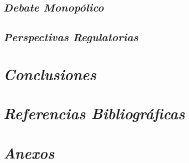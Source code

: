 \documentclass[12pt,a4paper]{article}
\begin{document}
\subsection{{\color{azulnoche}\textbf{\textit{Debate Monopólico}}}}

\subsection{{\color{azulnoche}\textbf{\textit{Perspectivas Regulatorias}}}}
\newpage

\section{{\color{azulnoche}\textbf{\textit{Conclusiones}}}}
\newpage

\section{{\color{azulnoche}\textbf{\textit{Referencias Bibliográficas}}}}
\nocite{*} %
\printbibliography[heading=none]
\newpage

\section{{\color{azulnoche}\textbf{\textit{Anexos}}}}
\end{document}
